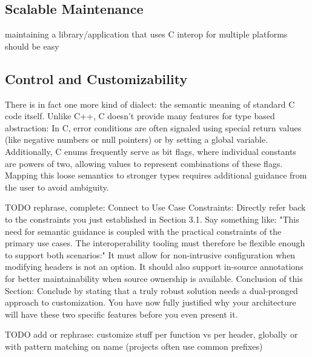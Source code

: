 \subsection{Scalable Maintenance}
maintaining a library/application that uses C interop for multiple platforms should be easy


\subsection{Control and Customizability}
There is in fact one more kind of dialect: the semantic meaning of standard C code itself. Unlike C++, C doesn't provide many features for type based abstraction: In C, error conditions are often signaled using special return values (like negative numbers or null pointers) or by setting a global variable. Additionally, C enums frequently serve as bit flags, where individual constants are powers of two, allowing values to represent combinations of these flags. Mapping this loose semantics to stronger types requires additional guidance from the user to avoid ambiguity.



TODO rephrase, complete: Connect to Use Case Constraints: Directly refer back to the constraints you just established in Section 3.1. Say something like: "This need for semantic guidance is coupled with the practical constraints of the primary use cases. The interoperability tooling must therefore be flexible enough to support both scenarios:"
It must allow for non-intrusive configuration when modifying headers is not an option.
It should also support in-source annotations for better maintainability when source ownership is available.
Conclusion of this Section: Conclude by stating that a truly robust solution needs a dual-pronged approach to customization. You have now fully justified why your architecture will have these two specific features before you even present it.

TODO add or rephrase: customize stuff per function vs per header, globally or with pattern matching on name (projects often use common prefixes)

